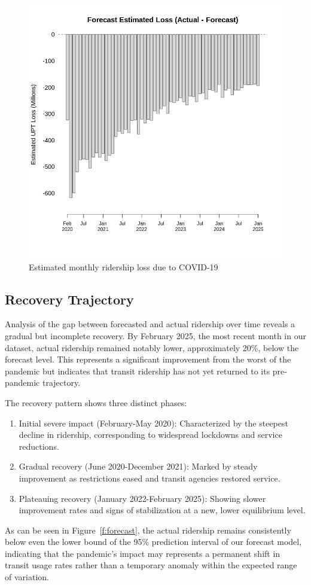 \documentclass[11pt]{article}
\begin{document}
\begin{figure}[!ht]
\centering
\includegraphics[width=0.525\linewidth]{estimated_loss.png}
\caption{Estimated monthly ridership loss due to COVID-19}
\label{f:loss}
\end{figure}

\subsection{Recovery Trajectory}

Analysis of the gap between forecasted and actual ridership over time reveals a gradual but incomplete recovery. By February 2025, the most recent month in our dataset, actual ridership remained notably lower, approximately 20\%, below the forecast level. This represents a significant improvement from the worst of the pandemic but indicates that transit ridership has not yet returned to its pre-pandemic trajectory.

The recovery pattern shows three distinct phases:
\begin{enumerate}
  \item Initial severe impact (February-May 2020): Characterized by the steepest decline in ridership, corresponding to widespread lockdowns and service reductions.
  \item Gradual recovery (June 2020-December 2021): Marked by steady improvement as restrictions eased and transit agencies restored service.
  \item Plateauing recovery (January 2022-February 2025): Showing slower improvement rates and signs of stabilization at a new, lower equilibrium level.
\end{enumerate}

As can be seen in Figure~\ref{f:forecast}, the actual ridership remains consistently below even the lower bound of the 95\% prediction interval of our forecast model, indicating that the pandemic's impact may represents a permanent shift in transit usage rates rather than a temporary anomaly within the expected range of variation.
\end{document}
